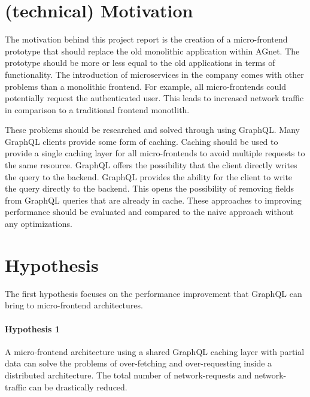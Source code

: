 \documentclass[MSE,Master,english]{twbook}%
\begin{document}




\section{(technical) Motivation}

The motivation behind this project report is the creation of a micro-frontend prototype that should replace the old monolithic application within AGnet. The prototype should be more or less equal to the old applications in terms of functionality. The introduction of microservices in the company comes with other problems than a monolithic frontend. For example, all micro-frontends could potentially request the authenticated user. This leads to increased network traffic in comparison to a traditional frontend monotlith.

These problems should be researched and solved through using GraphQL. Many GraphQL clients provide some form of caching. Caching should be used to provide a single caching layer for all micro-frontends to avoid multiple requests to the same resource. GraphQL offers the possibility that the client directly writes the query to the backend. GraphQL provides the ability for the client to write the query directly to the backend. This opens the possibility of removing fields from GraphQL queries that are already in cache. These approaches to improving performance should be evaluated and compared to the naive approach without any optimizations.

\section{Hypothesis}

The first hypothesis focuses on the performance improvement that GraphQL can bring to micro-frontend architectures.

\paragraph{Hypothesis 1} 
A micro-frontend architecture using a shared GraphQL caching layer with partial data can solve the problems of over-fetching and over-requesting inside a distributed architecture. The total number of network-requests and network-traffic can be drastically reduced.\\\\
\end{document}
